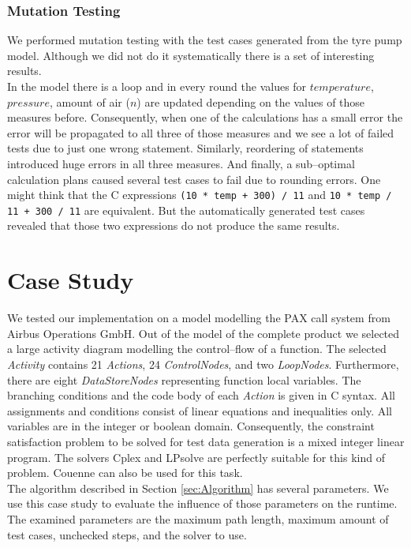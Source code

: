 \documentclass[runningheads,a4paper]{llncs}%
\newcommand{\UMLType}[1]{\textsf{\textit{#1}}} %
\begin{document}
\subsubsection{Mutation Testing}
We performed mutation testing with the test cases generated from the tyre pump model. Although we did not do it systematically there is a set of interesting results.\\
In the model there is a loop and in every round the values for $temperature$, $pressure$, amount of air ($n$) are updated depending on the values of those measures before. Consequently, when one of the calculations has a small error the error will be propagated to all three of those measures and we see a lot of failed tests due to just one wrong statement. Similarly, reordering of statements introduced huge errors in all three measures. And finally, a sub--optimal calculation plans caused several test cases to fail due to rounding errors. One might think that the C expressions \verb$(10 * temp + 300) / 11$ and \verb$10 * temp / 11 + 300 / 11$ are equivalent. But the automatically generated test cases revealed that those two expressions do not produce the same results.
\section{Case Study}%
\label{sec:CaseStudy}%
We tested our implementation on a model modelling the PAX call system from Airbus Operations GmbH. Out of the model of the complete product we selected a large activity diagram modelling the control--flow of a function. The selected \UMLType{Activity} contains 21 \UMLType{Actions}, 24 \UMLType{ControlNodes}, and two \UMLType{LoopNodes}. Furthermore, there are eight \UMLType{DataStoreNodes} representing function local variables. The branching conditions and the code body of each \UMLType{Action} is given in C syntax. All assignments and conditions consist of linear equations and inequalities only. All variables are in the integer or boolean domain. Consequently, the constraint satisfaction problem to be solved for test data generation is a mixed integer linear program. The solvers Cplex and LPsolve are perfectly suitable for this kind of problem. Couenne can also be used for this task.\\%
The algorithm described in Section \ref{sec:Algorithm} has several parameters. We use this case study to evaluate the influence of those parameters on the runtime. The examined parameters are the maximum path length, maximum amount of test cases, unchecked steps, and the solver to use.%
\end{document}
